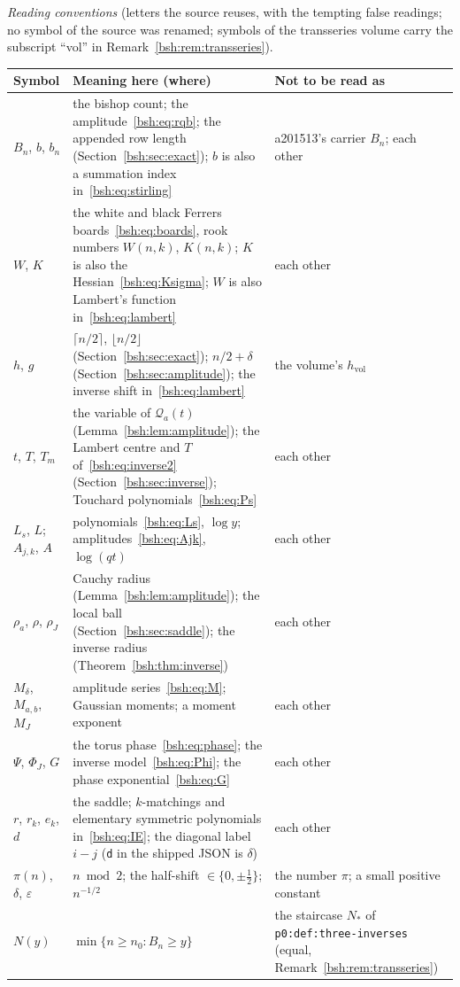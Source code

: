 \documentclass[11pt,letterpaper]{article}
\theoremstyle{remark}\newtheorem{remark}[theorem]{Remark}
\newcommand{\file}[1]{\nolinkurl{#1}}
\begin{document}
\medskip\noindent\begin{minipage}{\textwidth}
\emph{Reading conventions} (letters the source reuses, with the tempting
false readings; no symbol of the source was renamed; symbols of the
transseries volume carry the subscript ``vol'' in
Remark~\ref{bsh:rem:transseries}).\par
\smallskip
\begingroup\small\renewcommand{\arraystretch}{1.1}
\noindent\begin{tabular}{@{}>{\raggedright\arraybackslash}p{0.95in}>{\raggedright\arraybackslash}p{3.0in}>{\raggedright\arraybackslash}p{2.15in}@{}}
\toprule
Symbol & Meaning here (where) & Not to be read as\\
\midrule
$B_n$, $b$, $b_n$ & the bishop count; the amplitude~\eqref{bsh:eq:rqb}; the appended row length (Section~\ref{bsh:sec:exact}); $b$ is also a summation index in~\eqref{bsh:eq:stirling} & a201513's carrier $B_n$; each other\\
$W$, $K$ & the white and black Ferrers boards~\eqref{bsh:eq:boards}, rook numbers $W(n,k)$, $K(n,k)$; $K$ is also the Hessian~\eqref{bsh:eq:Ksigma}; $W$ is also Lambert's function in~\eqref{bsh:eq:lambert} & each other\\
$h$, $g$ & $\lceil n/2\rceil$, $\lfloor n/2\rfloor$ (Section~\ref{bsh:sec:exact}); $n/2+\delta$ (Section~\ref{bsh:sec:amplitude}); the inverse shift in~\eqref{bsh:eq:lambert} & the volume's $h_{\mathrm{vol}}$\\
$t$, $T$, $T_m$ & the variable of $\mathcal Q_a(t)$ (Lemma~\ref{bsh:lem:amplitude}); the Lambert centre and $T$ of~\eqref{bsh:eq:inverse2} (Section~\ref{bsh:sec:inverse}); Touchard polynomials~\eqref{bsh:eq:Ps} & each other\\
$L_s$, $L$; $A_{j,k}$, $A$ & polynomials~\eqref{bsh:eq:Ls}, $\log y$; amplitudes~\eqref{bsh:eq:Ajk}, $\log(qt)$ & each other\\
$\rho_a$, $\rho$, $\rho_J$ & Cauchy radius (Lemma~\ref{bsh:lem:amplitude}); the local ball (Section~\ref{bsh:sec:saddle}); the inverse radius (Theorem~\ref{bsh:thm:inverse}) & each other\\
$M_\delta$, $M_{a,b}$, $M_J$ & amplitude series~\eqref{bsh:eq:M}; Gaussian moments; a moment exponent & each other\\
$\Psi$, $\Phi_J$, $G$ & the torus phase~\eqref{bsh:eq:phase}; the inverse model~\eqref{bsh:eq:Phi}; the phase exponential~\eqref{bsh:eq:G} & each other\\
$r$, $r_k$, $e_k$, $d$ & the saddle; $k$-matchings and elementary symmetric polynomials in~\eqref{bsh:eq:IE}; the diagonal label $i-j$ (\texttt{d} in the shipped JSON is $\delta$) & each other\\
$\pi(n)$, $\delta$, $\varepsilon$ & $n\bmod 2$; the half-shift $\in\{0,\pm\frac12\}$; $n^{-1/2}$ & the number $\pi$; a small positive constant\\
$N(y)$ & $\min\{n\ge n_0:B_n\ge y\}$ & the staircase $N_\ast$ of \file{p0:def:three-inverses} (equal, Remark~\ref{bsh:rem:transseries})\\
\bottomrule
\end{tabular}
\endgroup
\end{minipage}
\end{document}
